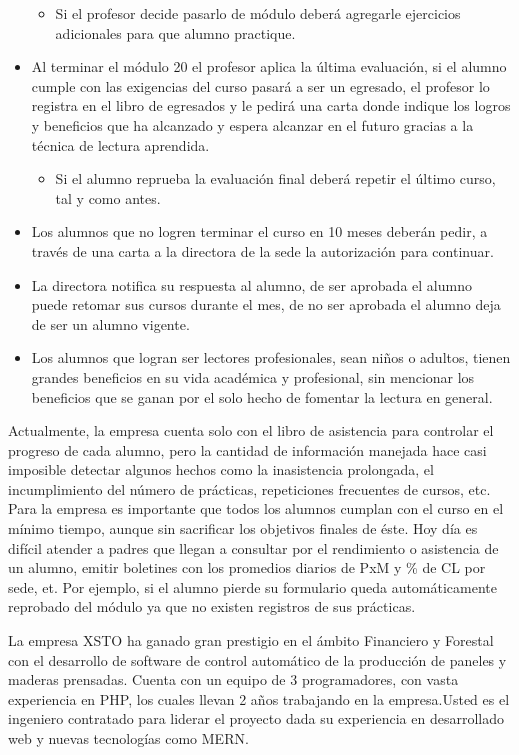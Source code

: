 \documentclass{templateApunte}
\newcommand{\newparagraph}{\par\vspace{\baselineskip}\noindent}
\begin{document}
\begin{itemize}
  \begin{itemize}
    \item Si el profesor decide pasarlo de módulo deberá agregarle ejercicios adicionales para que alumno practique.
  \end{itemize}
  \item Al terminar el módulo 20 el profesor aplica la última evaluación, si el alumno cumple con las exigencias del curso pasará a ser un egresado, el profesor lo registra en el libro de egresados y le pedirá una carta donde indique los logros y beneficios que ha alcanzado y espera alcanzar en el futuro gracias a la técnica de lectura aprendida.
  \begin{itemize}
    \item Si el alumno reprueba la evaluación final deberá repetir el último curso, tal y como antes.
  \end{itemize}
  \item Los alumnos que no logren terminar el curso en 10 meses deberán pedir, a través de una carta a la directora de la sede la autorización para continuar.
  \item La directora notifica su respuesta al alumno, de ser aprobada el alumno puede retomar sus cursos durante el mes, de no ser aprobada el alumno deja de ser un alumno vigente.
  \item Los alumnos que logran ser lectores profesionales, sean niños o adultos, tienen grandes beneficios en su vida académica y profesional, sin mencionar los beneficios que se ganan por el solo hecho de fomentar la lectura en general. 
\end{itemize}
Actualmente, la empresa cuenta solo con el libro de asistencia para controlar el progreso de cada alumno, pero la cantidad de información manejada hace casi imposible detectar algunos hechos como la inasistencia prolongada, el incumplimiento del número de prácticas, repeticiones frecuentes de cursos, etc.
Para la empresa es importante que todos los alumnos cumplan con el curso en el mínimo tiempo, aunque sin sacrificar los objetivos finales de éste.
Hoy día es difícil atender a padres que llegan a consultar por el rendimiento o asistencia de un alumno, emitir boletines con los promedios diarios de PxM y \% de CL por sede, et.
Por ejemplo, si el alumno pierde su formulario queda automáticamente reprobado del módulo ya que no existen registros de sus prácticas. 
\newparagraph
La empresa XSTO ha ganado gran prestigio en el ámbito Financiero y Forestal con el desarrollo de software de control automático de la producción de paneles y maderas prensadas. Cuenta con un equipo de 3 programadores, con vasta experiencia en PHP, los cuales llevan 2 años trabajando en la empresa.Usted es el ingeniero contratado para liderar el proyecto dada su experiencia en desarrollado web y nuevas tecnologías como MERN. 
\end{document}
